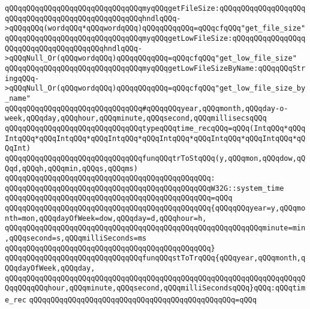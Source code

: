 \newline
\verb|qQQqqQQqqQQqqQQqqQQqqQQqqQQqqQQqmyqQQqgetFileSize:qQQqqQQqqQQqqQQqqQQqqQQqqQQqqQQqqQQqqQQqqQQqqQQqqQQqhndlqQQq->qQQqqQQq(wordqQQq*qQQqwordqQQq)qQQqqQQqqQQq=qQQqcfqQQq"get_file_size"|\newline
\verb|qQQqqQQqqQQqqQQqqQQqqQQqqQQqqQQqmyqQQqgetLowFileSize:qQQqqQQqqQQqqQQqqQQqqQQqqQQqqQQqqQQqqQQqhndlqQQq->qQQqNull_Or(qQQqwordqQQq)qQQqqQQqqQQq=qQQqcfqQQq"get_low_file_size"|\newline
\verb|qQQqqQQqqQQqqQQqqQQqqQQqqQQqqQQqmyqQQqgetLowFileSizeByName:qQQqqQQqStringqQQq->qQQqNull_Or(qQQqwordqQQq)qQQqqQQqqQQq=qQQqcfqQQq"get_low_file_size_by_name"|\newline
\newline
\verb|qQQqqQQqqQQqqQQqqQQqqQQqqQQqqQQq#qQQqqQQqyear,qQQqmonth,qQQqday-o-week,qQQqday,qQQqhour,qQQqminute,qQQqsecond,qQQqmillisecsqQQq|\newline
\verb|qQQqqQQqqQQqqQQqqQQqqQQqqQQqqQQqtypeqQQqtime_recqQQq=qQQq(IntqQQq*qQQqIntqQQq*qQQqIntqQQq*qQQqIntqQQq*qQQqIntqQQq*qQQqIntqQQq*qQQqIntqQQq*qQQqInt)|\newline
\newline
\verb|qQQqqQQqqQQqqQQqqQQqqQQqqQQqqQQqfunqQQqtrToStqQQq(y,qQQqmon,qQQqdow,qQQqd,qQQqh,qQQqmin,qQQqs,qQQqms)|\newline
\verb|qQQqqQQqqQQqqQQqqQQqqQQqqQQqqQQqqQQqqQQqqQQqqQQq:|\newline
\verb|qQQqqQQqqQQqqQQqqQQqqQQqqQQqqQQqqQQqqQQqqQQqqQQqW32G::system_time|\newline
\verb|qQQqqQQqqQQqqQQqqQQqqQQqqQQqqQQqqQQqqQQqqQQqqQQq=qQQq|\newline
\verb|qQQqqQQqqQQqqQQqqQQqqQQqqQQqqQQqqQQqqQQqqQQqqQQq{qQQqqQQqyear=y,qQQqmonth=mon,qQQqdayOfWeek=dow,qQQqday=d,qQQqhour=h,|\newline
\verb|qQQqqQQqqQQqqQQqqQQqqQQqqQQqqQQqqQQqqQQqqQQqqQQqqQQqqQQqqQQqminute=min,qQQqsecond=s,qQQqmilliSeconds=ms|\newline
\verb|qQQqqQQqqQQqqQQqqQQqqQQqqQQqqQQqqQQqqQQqqQQqqQQq}|\newline
\newline
\verb|qQQqqQQqqQQqqQQqqQQqqQQqqQQqqQQqfunqQQqstToTrqQQq{qQQqyear,qQQqmonth,qQQqdayOfWeek,qQQqday,|\newline
\verb|qQQqqQQqqQQqqQQqqQQqqQQqqQQqqQQqqQQqqQQqqQQqqQQqqQQqqQQqqQQqqQQqqQQqqQQqqQQqqQQqhour,qQQqminute,qQQqsecond,qQQqmilliSecondsqQQq}qQQq:qQQqtime_rec|\newline
\verb|qQQqqQQqqQQqqQQqqQQqqQQqqQQqqQQqqQQqqQQqqQQqqQQq=qQQq|\newline
